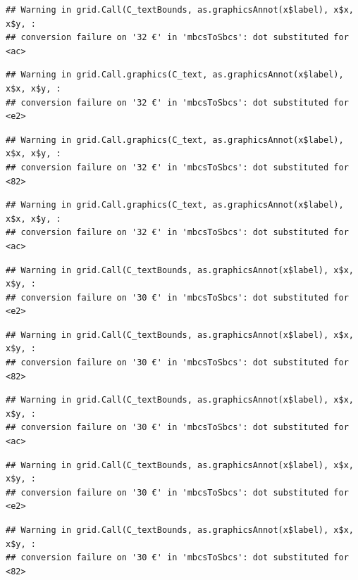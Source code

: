 \documentclass[
]{article}
\begin{document}
\begin{verbatim}
## Warning in grid.Call(C_textBounds, as.graphicsAnnot(x$label), x$x, x$y, :
## conversion failure on '32 €' in 'mbcsToSbcs': dot substituted for <ac>
\end{verbatim}

\begin{verbatim}
## Warning in grid.Call.graphics(C_text, as.graphicsAnnot(x$label), x$x, x$y, :
## conversion failure on '32 €' in 'mbcsToSbcs': dot substituted for <e2>
\end{verbatim}

\begin{verbatim}
## Warning in grid.Call.graphics(C_text, as.graphicsAnnot(x$label), x$x, x$y, :
## conversion failure on '32 €' in 'mbcsToSbcs': dot substituted for <82>
\end{verbatim}

\begin{verbatim}
## Warning in grid.Call.graphics(C_text, as.graphicsAnnot(x$label), x$x, x$y, :
## conversion failure on '32 €' in 'mbcsToSbcs': dot substituted for <ac>
\end{verbatim}

\begin{verbatim}
## Warning in grid.Call(C_textBounds, as.graphicsAnnot(x$label), x$x, x$y, :
## conversion failure on '30 €' in 'mbcsToSbcs': dot substituted for <e2>
\end{verbatim}

\begin{verbatim}
## Warning in grid.Call(C_textBounds, as.graphicsAnnot(x$label), x$x, x$y, :
## conversion failure on '30 €' in 'mbcsToSbcs': dot substituted for <82>
\end{verbatim}

\begin{verbatim}
## Warning in grid.Call(C_textBounds, as.graphicsAnnot(x$label), x$x, x$y, :
## conversion failure on '30 €' in 'mbcsToSbcs': dot substituted for <ac>
\end{verbatim}

\begin{verbatim}
## Warning in grid.Call(C_textBounds, as.graphicsAnnot(x$label), x$x, x$y, :
## conversion failure on '30 €' in 'mbcsToSbcs': dot substituted for <e2>
\end{verbatim}

\begin{verbatim}
## Warning in grid.Call(C_textBounds, as.graphicsAnnot(x$label), x$x, x$y, :
## conversion failure on '30 €' in 'mbcsToSbcs': dot substituted for <82>
\end{verbatim}
\end{document}
